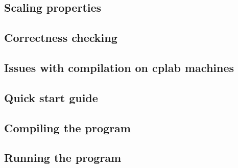 \documentclass[11pt,a4paper]{article}
\begin{document}
\subsection{Scaling properties}
\subsection{Correctness checking}
\subsection{Issues with compilation on cplab machines}


\newpage
\begin{appendices}
\section{Quick start guide}
\subsection{Compiling the program}
\subsection{Running the program}

\end{appendices}
\end{document}
